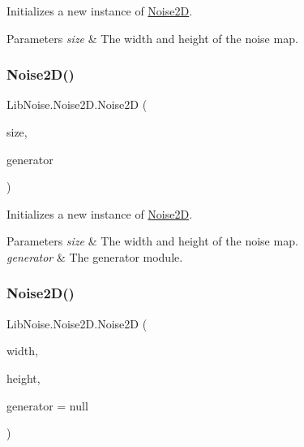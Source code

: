 Initializes a new instance of \hyperlink{class_lib_noise_1_1_noise2_d}{Noise2D}. 


\begin{DoxyParams}{Parameters}
{\em size} & The width and height of the noise map.\\
\hline
\end{DoxyParams}
\mbox{\label{class_lib_noise_1_1_noise2_d_a4f2c693c60b8327c5c906f137293a8c2}} 
\subsubsection{\texorpdfstring{Noise2\+D()}{Noise2D()}\hspace{0.1cm}{\footnotesize\ttfamily [3/4]}}
{\footnotesize\ttfamily Lib\+Noise.\+Noise2\+D.\+Noise2D (\begin{DoxyParamCaption}\item[{int}]{size,  }\item[{\hyperlink{class_lib_noise_1_1_module_base}{Module\+Base}}]{generator }\end{DoxyParamCaption})}



Initializes a new instance of \hyperlink{class_lib_noise_1_1_noise2_d}{Noise2D}. 


\begin{DoxyParams}{Parameters}
{\em size} & The width and height of the noise map.\\
\hline
{\em generator} & The generator module.\\
\hline
\end{DoxyParams}
\mbox{\label{class_lib_noise_1_1_noise2_d_a89d44465cd842be3f3a8b31e78f43072}} 
\subsubsection{\texorpdfstring{Noise2\+D()}{Noise2D()}\hspace{0.1cm}{\footnotesize\ttfamily [4/4]}}
{\footnotesize\ttfamily Lib\+Noise.\+Noise2\+D.\+Noise2D (\begin{DoxyParamCaption}\item[{int}]{width,  }\item[{int}]{height,  }\item[{\hyperlink{class_lib_noise_1_1_module_base}{Module\+Base}}]{generator = {\ttfamily null} }\end{DoxyParamCaption})}



